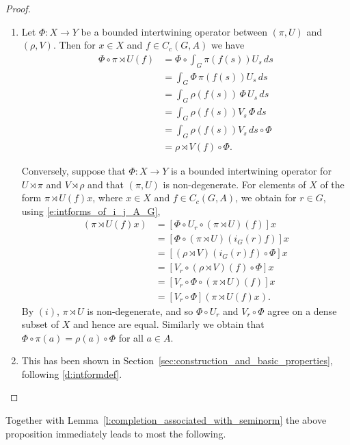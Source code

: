 \documentclass{amsart}
\theoremstyle{plain}
\theoremstyle{definition}
\numberwithin{equation}{section}
\begin{document}
\begin{proof}
\begin{enumerate}
\item Let $\Phi: X \to Y$ be a bounded intertwining operator between ${(\pi,U)}$ and $(\rho, V)$. Then for $x \in X$ and $f \in C_c(G,A)$ we have
\begin{align*}
 \Phi \circ {\pi \rtimes U}(f) &= \Phi \circ \int_G \pi(f(s)) U_s {\,ds} \\
&= \int_G \Phi \, \pi(f(s)) U_s {\,ds} \\
&= \int_G \rho(f(s)) \, \Phi \, U_s {\,ds} \\
&= \int_G \rho(f(s)) V_s \, \Phi {\,ds} \\
&= \int_G \rho(f(s)) V_s {\,ds} \circ \Phi \\
&= \rho {\rtimes} V(f) \circ \Phi.
\end{align*}

Conversely, suppose that $\Phi: X \to Y$ is a bounded intertwining operator for ${U \rtimes \pi}$ and $V {\rtimes} \rho$ and that ${(\pi,U)}$ is non-degenerate. For elements of $X$ of the form ${\pi \rtimes U}(f)x$, where $x \in X$ and $f \in C_c(G,A)$, we obtain for $r \in G$, using \eqref{e:intforms_of_i_j_A_G},
\begin{align*}
 [\Phi \circ U_r] ({\pi \rtimes U}(f)x) &= [\Phi \circ U_r \circ ({\pi \rtimes U})(f)] x \\
&= [\Phi \circ ({\pi \rtimes U})(i_G(r)f)] x \\
&= [(\rho {\rtimes} V)(i_G(r)f) \circ \Phi] x \\
&= [V_r \circ (\rho {\rtimes} V)(f) \circ \Phi] x \\
&= [V_r \circ \Phi \circ ({\pi \rtimes U})(f)] x \\
&= [V_r \circ \Phi] ({\pi \rtimes U}(f)x).
\end{align*}
By $(i)$, ${\pi \rtimes U}$ is non-degenerate, and so $\Phi \circ U_r$ and $V_r \circ \Phi$ agree on a dense subset of $X$ and hence are equal. Similarly we obtain that $\Phi \circ \pi(a) = \rho(a) \circ \Phi$ for all $a \in A$.

\item This has been shown in Section~\ref{sec:construction_and_basic_properties}, following \eqref{d:intformdef}.
\end{enumerate}
\end{proof}

Together with Lemma~\ref{l:completion_associated_with_seminorm} the above proposition immediately leads to most the following.
\end{document}
